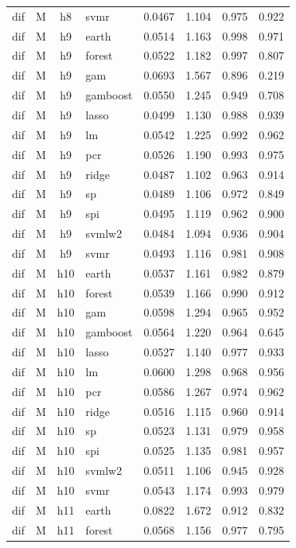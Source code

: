 \begin{ThreePartTable}
\begin{longtable}[t]{llclcccc}
dif & M & h8 & svmr & 0.0467 & 1.104 & 0.975 & 0.922\\
\addlinespace
dif & M & h9 & earth & 0.0514 & 1.163 & 0.998 & 0.971\\
dif & M & h9 & forest & 0.0522 & 1.182 & 0.997 & 0.807\\
dif & M & h9 & gam & 0.0693 & 1.567 & 0.896 & 0.219\\
dif & M & h9 & gamboost & 0.0550 & 1.245 & 0.949 & 0.708\\
dif & M & h9 & lasso & 0.0499 & 1.130 & 0.988 & 0.939\\
dif & M & h9 & lm & 0.0542 & 1.225 & 0.992 & 0.962\\
dif & M & h9 & pcr & 0.0526 & 1.190 & 0.993 & 0.975\\
dif & M & h9 & ridge & 0.0487 & 1.102 & 0.963 & 0.914\\
dif & M & h9 & sp & 0.0489 & 1.106 & 0.972 & 0.849\\
dif & M & h9 & spi & 0.0495 & 1.119 & 0.962 & 0.900\\
dif & M & h9 & svmlw2 & 0.0484 & 1.094 & 0.936 & 0.904\\
dif & M & h9 & svmr & 0.0493 & 1.116 & 0.981 & 0.908\\
\addlinespace
dif & M & h10 & earth & 0.0537 & 1.161 & 0.982 & 0.879\\
dif & M & h10 & forest & 0.0539 & 1.166 & 0.990 & 0.912\\
dif & M & h10 & gam & 0.0598 & 1.294 & 0.965 & 0.952\\
dif & M & h10 & gamboost & 0.0564 & 1.220 & 0.964 & 0.645\\
dif & M & h10 & lasso & 0.0527 & 1.140 & 0.977 & 0.933\\
dif & M & h10 & lm & 0.0600 & 1.298 & 0.968 & 0.956\\
dif & M & h10 & pcr & 0.0586 & 1.267 & 0.974 & 0.962\\
dif & M & h10 & ridge & 0.0516 & 1.115 & 0.960 & 0.914\\
dif & M & h10 & sp & 0.0523 & 1.131 & 0.979 & 0.958\\
dif & M & h10 & spi & 0.0525 & 1.135 & 0.981 & 0.957\\
dif & M & h10 & svmlw2 & 0.0511 & 1.106 & 0.945 & 0.928\\
dif & M & h10 & svmr & 0.0543 & 1.174 & 0.993 & 0.979\\
\addlinespace
dif & M & h11 & earth & 0.0822 & 1.672 & 0.912 & 0.832\\
dif & M & h11 & forest & 0.0568 & 1.156 & 0.977 & 0.795\\

\end{longtable}
\end{ThreePartTable}
